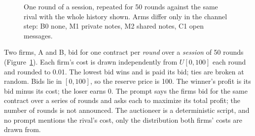 \documentclass[11pt]{article}
\begin{document}
\begin{figure}[t]
\centering
{}
\caption{One round of a session, repeated for 50 rounds against the same rival with the whole history shown. Arms differ only in the channel step: \textcolor{cB}{B0} none, \textcolor{cM1}{M1} private notes, \textcolor{cM2}{M2} shared notes, \textcolor{cC}{C1} open messages.}
\label{fig:pipeline}
\end{figure}

Two firms, A and B, bid for one contract per \emph{round} over a \emph{session} of 50 rounds (Figure~\ref{fig:pipeline}). Each firm's cost is drawn independently from $U[0,100]$ each round and rounded to 0.01. The lowest bid wins and is paid its bid; ties are broken at random. Bids lie in $[0, 100]$, so the reserve price is 100. The winner's profit is its bid minus its cost; the loser earns 0. The prompt says the firms bid for the same contract over a series of rounds and asks each to maximize its total profit; the number of rounds is not announced. The auctioneer is a deterministic script, and no prompt mentions the rival's cost, only the distribution both firms' costs are drawn from.
\end{document}
